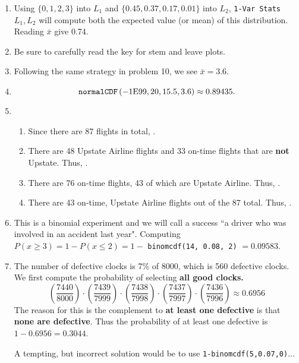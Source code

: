 \documentclass{article}
\newcommand{\answer}[1]{{\color{red}{\large \textbf{#1}}}}
\begin{document}
\begin{enumerate}
\item \answer{D} Using $\{0,1,2,3\}$ into $L_1$ and $\{0.45, 0.37, 0.17, 0.01\}$ into $L_2$, \texttt{1-Var Stats} $L_1, L_2$ will compute both the expected value (or mean) of this distribution. Reading $\bar{x}$ give 0.74.

\item \answer{C} Be sure to carefully read the key for stem and leave plots.

\item \answer{B} Following the same strategy in problem 10, we see $\bar{x}=3.6$.

\item \answer{C} $$\mbox{\texttt{normalCDF}}\left(-1\mbox{E}99, 20, 15.5, 3.6 \right) \approx 0.89435.$$

\item \begin{enumerate}
        \item Since there are 87 flights in total, \answer{$48/87$}.
        \item There are 48 Upstate Airline flights and 33 on-time flights that are {\bf not} Upstate. Thus, \answer{$81/87$}.
        \item There are 76 on-time flights, 43 of which are Upstate Airline. Thus, \answer{$43/76$}.
        \item There are 43 on-time, Upstate Airline flights out of the 87 total. Thus, \answer{$43/87$}.
    \end{enumerate}
    
\item \answer{B} This is a binomial experiment and we will call a success ``a driver who was involved in an accident last year". Computing $P(x\geq 3 ) = 1-P(x\leq 2) = 1-$ \texttt{binomcdf(14, 0.08, 2)} $=0.09583$.

\newpage

\item The number of defective clocks is 7\% of 8000, which is 560 defective clocks. We first compute the probability of selecting \textbf{all good clocks.}
$$\left(\frac{7440}{8000}\right)\cdot\left(\frac{7439}{7999}\right)\cdot\left(\frac{7438}{7998}\right)\cdot\left(\frac{7437}{7997}\right)\cdot\left(\frac{7436}{7996}\right)\approx 0.6956$$
The reason for this is the complement to \textbf{at least one defective} is that \textbf{none are defective}. Thus the probability of at least one defective is $1-0.6956=0.3044$.

A tempting, but incorrect solution would be to use \texttt{1-binomcdf(5,0.07,0)}...


\end{enumerate}
\end{document}

